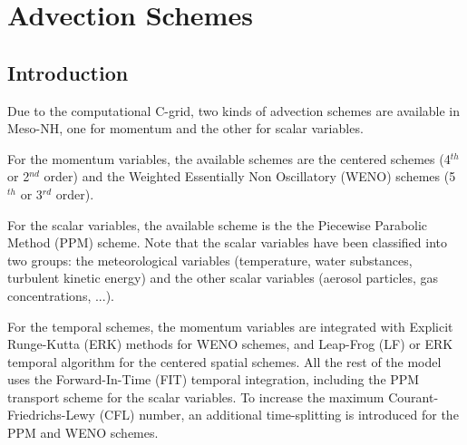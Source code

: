%
%

\chapter{Advection Schemes}
\minitoc


\section{Introduction}
Due to the computational C-grid, two kinds of advection schemes are available in Meso-NH, one for momentum and the other for scalar variables.

For the momentum variables, the available schemes are the centered schemes (4$^{th}$ or 2$^{nd}$ order) and the Weighted Essentially Non Oscillatory (WENO) schemes (5$^{th}$ or 3$^{rd}$ order).

For the scalar variables, the available scheme is the the Piecewise Parabolic Method (PPM) scheme.
Note that the scalar variables have been classified into two groups: the meteorological variables
(temperature, water substances, turbulent kinetic energy) and the other scalar variables (aerosol particles, gas concentrations, ...).

For the temporal schemes, the momentum variables are integrated with Explicit Runge-Kutta (ERK) methods for WENO schemes, and Leap-Frog (LF) or ERK temporal algorithm for the centered spatial schemes. 
All the rest of the model uses the Forward-In-Time (FIT) temporal integration, including the PPM transport scheme for the scalar variables. To increase the maximum Courant-Friedrichs-Lewy (CFL) number, an additional time-splitting is introduced for the PPM and WENO schemes.

